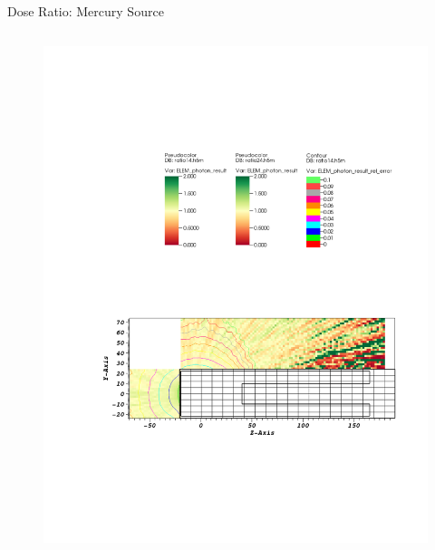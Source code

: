\documentclass{beamer}
\begin{document}
\begin{frame}{Dose Ratio: Mercury Source}
\begin{columns}[T]
\begin{figure}
                \includegraphics[scale=0.49,trim={20cm 16.5cm 7cm 6cm},clip]{figs/ratio_mer_novoid.pdf}
        \end{figure}

\end{columns}
\end{frame}


\end{document}
